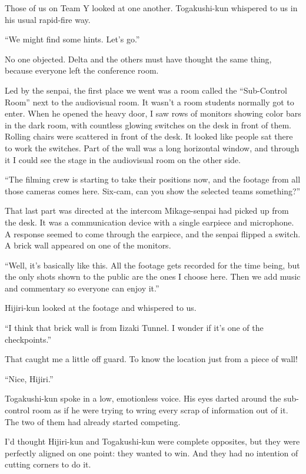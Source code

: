 \documentclass[
    a4paper,
    12pt,
    twoside,
    openany,
    UTF8,
    fontset=windows
]{ctexbook}
\begin{document}
Those of us on Team Y looked at one another. Togakushi-kun whispered to us in his usual rapid-fire way.

``We might find some hints. Let's go.''

No one objected. Delta and the others must have thought the same thing, because everyone left the conference room.

Led by the senpai, the first place we went was a room called the ``Sub-Control Room'' next to the audiovisual room. It wasn't a room students normally got to enter. When he opened the heavy door, I saw rows of monitors showing color bars in the dark room, with countless glowing switches on the desk in front of them. Rolling chairs were scattered in front of the desk. It looked like people sat there to work the switches. Part of the wall was a long horizontal window, and through it I could see the stage in the audiovisual room on the other side.

``The filming crew is starting to take their positions now, and the footage from all those cameras comes here. Six-cam, can you show the selected teams something?''

That last part was directed at the intercom Mikage-senpai had picked up from the desk. It was a communication device with a single earpiece and microphone. A response seemed to come through the earpiece, and the senpai flipped a switch. A brick wall appeared on one of the monitors.

``Well, it's basically like this. All the footage gets recorded for the time being, but the only shots shown to the public are the ones I choose here. Then we add music and commentary so everyone can enjoy it.''

Hijiri-kun looked at the footage and whispered to us.

``I think that brick wall is from Iizaki Tunnel. I wonder if it's one of the checkpoints.''

That caught me a little off guard. To know the location just from a piece of wall!

``Nice, Hijiri.''

Togakushi-kun spoke in a low, emotionless voice. His eyes darted around the sub-control room as if he were trying to wring every scrap of information out of it. The two of them had already started competing.

I'd thought Hijiri-kun and Togakushi-kun were complete opposites, but they were perfectly aligned on one point: they wanted to win. And they had no intention of cutting corners to do it.
\end{document}
